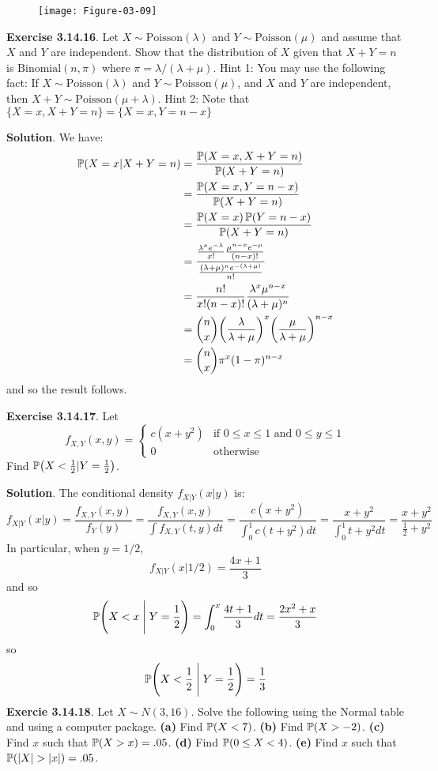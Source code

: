 \begin{figure}[H]
\centering
\texttt{[image: Figure-03-09]}
\end{figure}


\textbf{Exercise 3.14.16}. Let \(X \sim \text{Poisson}(\lambda)\) and
\(Y \sim \text{Poisson}(\mu)\) and assume that \(X\) and \(Y\) are
independent. Show that the distribution of \(X\) given that
\(X + Y = n\) is \(\text{Binomial}(n, \pi)\) where
\(\pi = \lambda / (\lambda + \mu)\).
Hint 1: You may use the following fact: If
\(X \sim \text{Poisson}(\lambda)\) and \(Y \sim \text{Poisson}(\mu)\),
and \(X\) and \(Y\) are independent, then
\(X + Y \sim \text{Poisson}(\mu + \lambda)\).
Hint 2: Note that \(\{X = x, X + Y = n\} = \{X = x, Y = n - x \}\)

\textbf{Solution}.
We have:
\begin{align*}
\PROB(X = x | X + Y = n) &= \frac{\PROB(X = x, X + Y = n)}{\PROB(X + Y = n)} \\
&= \frac{\PROB(X = x, Y = n - x)}{\PROB(X + Y = n)} \\
&= \frac{\PROB(X = x) \PROB(Y = n - x)}{\PROB(X + Y = n)} \\
&= \frac{\frac{\lambda^x e^{-\lambda}}{x!} \frac{\mu^{n - x} e^{-\mu}}{(n - x)!} }{\frac{(\lambda + \mu)^{n} e^{-(\lambda + \mu)}}{n!}} \\
&= \frac{n!}{x! (n - x)!} \frac{\lambda^x \mu^{n - x}}{(\lambda + \mu)^{n}} \\
&= \binom{n}{x} \left( \frac{\lambda}{\lambda + \mu} \right)^x \left( \frac{\mu}{\lambda + \mu}\right)^{n - x} \\
&= \binom{n}{x} \pi^x (1 - \pi)^{n - x}
\end{align*}
and so the result follows.

\textbf{Exercise 3.14.17}. Let
\[
f_{X, Y}(x, y) = 
\begin{cases}
c(x + y^{2}) &\text{if } 0 \leq x \leq 1 \text{ and }  0 \leq y \leq 1 
\\[
1ex]
0 & \text{otherwise}
\end{cases}
\]
Find \(\PROB\left( X < \frac{1}{2} | Y = \frac{1}{2} \right)\).

\textbf{Solution}.
The conditional density \(f_{X | Y}(x | y)\) is:
\[
f_{X|Y}(x | y) = \frac{f_{X, Y}(x, y)}{f_Y(y)} = \frac{f_{X, Y}(x, y)}{\int f_{X, Y}(t, y) dt}
= \frac{ c(x + y^{2}) }{\int_{0}^{1} c(t + y^{2}) dt} =  \frac{ x + y^{2} }{\int_{0}^{1} t + y^{2} dt} = \frac{x + y^{2}}{\frac{1}{2} + y^{2}}
\]
In particular, when \(y = 1/2\),
\[
f_{X|Y}(x | 1/2) = \frac{4x + 1}{3}
\]
and so
\[
\PROB\left( X < x \;\Bigg|\; Y = \frac{1}{2} \right) = \int_{0}^x \frac{4t + 1}{3} dt = \frac{2x^{2} + x}{3}
\]
so
\[
\PROB\left( X < \frac{1}{2} \;\Bigg|\; Y = \frac{1}{2} \right) = \frac{1}{3}
\]
\textbf{Exercie 3.14.18}. Let \(X \sim N(3, 16)\). Solve the following
using the Normal table and using a computer package.
\textbf{(a)} Find \(\operatorname{\mathbb{P}}(X < 7)\).
\textbf{(b)} Find \(\operatorname{\mathbb{P}}(X > -2)\).
\textbf{(c)} Find \(x\) such that \(\operatorname{\mathbb{P}}(X > x) = .05\).
\textbf{(d)} Find \(\operatorname{\mathbb{P}}(0 \leq X < 4)\).
\textbf{(e)} Find \(x\) such that \(\operatorname{\mathbb{P}}(|X| > |x|) = .05\).

